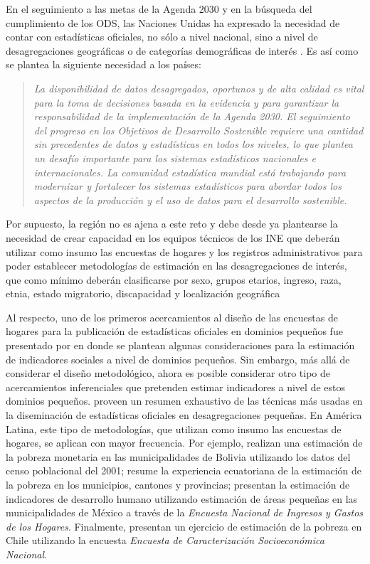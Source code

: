 \documentclass[
  12pt,
  spanish,
]{book}
\begin{document}
En el seguimiento a las metas de la Agenda 2030 y en la búsqueda del cumplimiento de los ODS, las Naciones Unidas ha expresado la necesidad de contar con estadísticas oficiales, no sólo a nivel nacional, sino a nivel de desagregaciones geográficas o de categorías demográficas de interés \citep{United_Nations_2017}. Es así como se plantea la siguiente necesidad a los países:

\begin{quote}
\emph{La disponibilidad de datos desagregados, oportunos y de alta calidad es vital para la toma de decisiones basada en la evidencia y para garantizar la responsabilidad de la implementación de la Agenda 2030. El seguimiento del progreso en los Objetivos de Desarrollo Sostenible requiere una cantidad sin precedentes de datos y estadísticas en todos los niveles, lo que plantea un desafío importante para los sistemas estadísticos nacionales e internacionales. La comunidad estadística mundial está trabajando para modernizar y fortalecer los sistemas estadísticos para abordar todos los aspectos de la producción y el uso de datos para el desarrollo sostenible.}
\end{quote}

Por supuesto, la región no es ajena a este reto y debe desde ya plantearse la necesidad de crear capacidad en los equipos técnicos de los INE que deberán utilizar como insumo las encuestas de hogares y los registros administrativos para poder establecer metodologías de estimación en las desagregaciones de interés, que como mínimo deberán clasificarse por sexo, grupos etarios, ingreso, raza, etnia, estado migratorio, discapacidad y localización geográfica \citep{United_Nations_2016}

Al respecto, uno de los primeros acercamientos al diseño de las encuestas de hogares para la publicación de estadísticas oficiales en dominios pequeños fue presentado por \citet{Sinngh_Gambino_Mantel_1994} en donde se plantean algunas consideraciones para la estimación de indicadores sociales a nivel de dominios pequeños. Sin embargo, más allá de considerar el diseño metodológico, ahora es posible considerar otro tipo de acercamientos inferenciales que pretenden estimar indicadores a nivel de estos dominios pequeños. \citet{Rao_Molina_2014} proveen un resumen exhaustivo de las técnicas más usadas en la diseminación de estadísticas oficiales en desagregaciones pequeñas. En América Latina, este tipo de metodologías, que utilizan como insumo las encuestas de hogares, se aplican con mayor frecuencia. Por ejemplo, \citet{arias2007geography} realizan una estimación de la pobreza monetaria en las municipalidades de Bolivia utilizando los datos del censo poblacional del 2001; \citet{araujo20071990} resume la experiencia ecuatoriana de la estimación de la pobreza en los municipios, cantones y provincias; \citet{lopez2007poverty} presentan la estimación de indicadores de desarrollo humano utilizando estimación de áreas pequeñas en las municipalidades de México a través de la \emph{Encuesta Nacional de Ingresos y Gastos de los Hogares}. Finalmente, \citet{Casas_Cordero_Valencia_Encina_Lahiri_2016} presentan un ejercicio de estimación de la pobreza en Chile utilizando la encuesta \emph{Encuesta de Caracterización Socioeconómica Nacional}.
\end{document}
